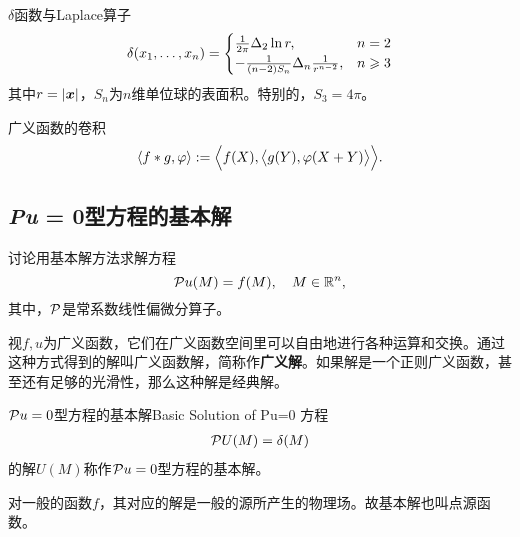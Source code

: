 \begin{example}{$\delta$函数与Laplace算子}{}
	\begin{equation}
		\delta(x_1,\ldots,x_n)=\begin{cases}
			\frac1{2\pi}\Delta_2\ln r,&n=2\\
			-\frac1{(n-2)S_{n}}\Delta_n\frac1{r^{n-2}},&n\geqslant 3
		\end{cases}
	\end{equation}
	其中$r=\left\lvert\bm x\right\rvert$，$S_n$为$n$维单位球的表面积。特别的，$S_3=4\pi$。
\end{example}
广义函数的卷积
\[
	\left\langle f\ast g,\varphi\right\rangle:=\Bigl\langle f(X),\bigl\langle g(Y),\varphi(X+Y)\bigr\rangle\Bigr\rangle.
\]

\subsection{\textit{Pu} = 0型方程的基本解} %
讨论用基本解方法求解方程
\[
	\mathcal P u(M)=f(M),\quad M\in\mathbb R^n,
\]
其中，$\mathcal P$是常系数线性偏微分算子。

视$f,u$为广义函数，它们在广义函数空间里可以自由地进行各种运算和交换。通过这种方式得到的解叫广义函数解，简称作\textbf{广义解}。如果解是一个正则广义函数，甚至还有足够的光滑性，那么这种解是经典解。
\begin{definition}{$\mathcal P u=0$型方程的基本解}{Basic Solution of Pu=0}
	方程
	\begin{align}
		\mathcal P U(M)=\mathop{}\!\delta(M)
	\end{align}
	的解$U(M)$称作$\mathcal P u=0$型方程的基本解。
\end{definition}
对一般的函数$f$，其对应的解是一般的源所产生的物理场。故基本解也叫点源函数。

